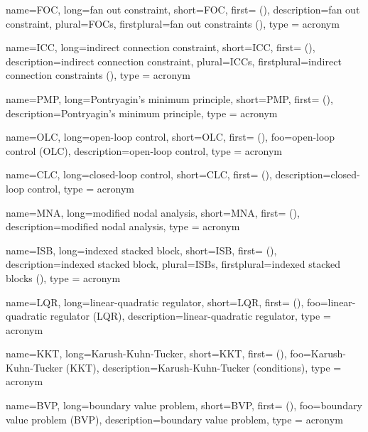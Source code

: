 {
	name={FOC},
	long=fan out constraint,
	short={FOC},
	first={} (),
	description=fan out constraint,
	plural={FOCs},
	firstplural={fan out constraints ()},
	type = acronym
}

{
	name={ICC},
	long={indirect connection constraint},
	short={ICC},
	first={} (),
	description={indirect connection constraint},
	plural={ICCs},
	firstplural={indirect connection constraints ()},
	type = acronym
}

{
	name={PMP},
	long={Pontryagin's minimum principle},
	short={PMP},
	first={} (),
	description={Pontryagin's minimum principle},
	type = acronym
}

{
	name={OLC},
	long={open-loop control},
	short={OLC},
	first={} (),
	foo={open-loop control (OLC)},
	description={open-loop control},
	type = acronym
}

{
	name={CLC},
	long={closed-loop control},
	short={CLC},
	first={} (),
	description={closed-loop control},
	type = acronym
}

{
	name={MNA},
	long={modified nodal analysis},
	short={MNA},
	first={} (),
	description={modified nodal analysis},
	type = acronym
}

{
	name={ISB},
	long=indexed stacked block,
	short={ISB},
	first={} (),
	description=indexed stacked block,
	plural={ISBs},
	firstplural={indexed stacked blocks ()},
	type = acronym
}

{
	name={LQR},
	long={linear-quadratic regulator},
	short={LQR},
	first={} (),
	foo={linear-quadratic regulator (LQR)},
	description={linear-quadratic regulator},
	type = acronym
}

{
	name={KKT},
	long={Karush-Kuhn-Tucker},
	short={KKT},
	first={} (),
	foo={Karush-Kuhn-Tucker (KKT)},
	description={Karush-Kuhn-Tucker (conditions)},
	type = acronym
}

{
	name={BVP},
	long={boundary value problem},
	short={BVP},
	first={} (),
	foo={boundary value problem (BVP)},
	description={boundary value problem},
	type = acronym
}

